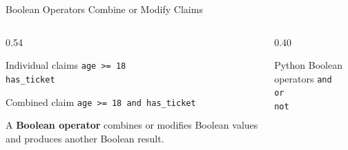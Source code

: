 \documentclass[aspectratio=169,10pt]{beamer}
\begin{document}

\begin{frame}{Boolean Operators Combine or Modify Claims}
  \begin{columns}[T,onlytextwidth]
    \begin{column}{0.54\textwidth}
      \begin{block}{Individual claims}
        \texttt{age >= 18}\\
        \texttt{has\_ticket}
      \end{block}

      \begin{block}{Combined claim}
        \centering
        \Large\texttt{age >= 18 and has\_ticket}
      \end{block}

      \begin{cpdefinition}
        A \textbf{Boolean operator} combines or modifies Boolean values and produces another Boolean result.
      \end{cpdefinition}
    \end{column}

    \begin{column}{0.40\textwidth}
      \begin{block}{Python Boolean operators}
        \centering
        \Large\texttt{and}\\[0.16in]
        \Large\texttt{or}\\[0.16in]
        \Large\texttt{not}
      \end{block}
    \end{column}
  \end{columns}
\end{frame}
\end{document}
